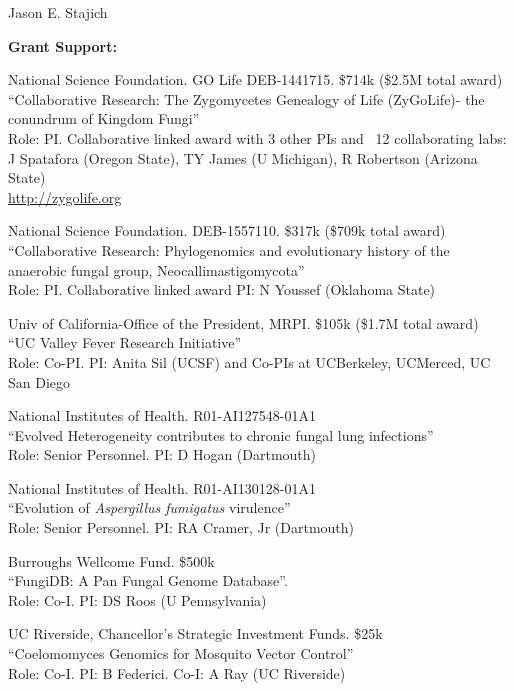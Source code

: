 \documentclass[10pt]{article}
\begin{document}
\begin{cv}{\centerline{Jason E. Stajich}}
\begin{cvlistcompact}{\bf Grant Support:}
\item [2015-2018] National Science Foundation. GO Life
  DEB-1441715. \$714k (\$2.5M total award) \\
``Collaborative Research: The Zygomycetes Genealogy of Life
  (ZyGoLife)- the conundrum of Kingdom Fungi'' \\
  Role: PI. Collaborative linked award with 3 other PIs and ~12
  collaborating labs: J Spatafora (Oregon State), TY James (U
  Michigan), R Robertson (Arizona State) \\
\url{http://zygolife.org} 

\item [2016-2019] National Science Foundation. DEB-1557110. \$317k
  (\$709k total award) \\
``Collaborative Research: Phylogenomics and evolutionary history of the anaerobic fungal group, Neocallimastigomycota'' \\
Role: PI. Collaborative linked award PI: N Youssef (Oklahoma State)

\item [2017-2020] Univ of California-Office of the President, MRPI. \$105k
  (\$1.7M total award) \\
``UC Valley Fever Research Initiative'' \\
Role: Co-PI.  PI: Anita Sil (UCSF) and Co-PIs at UCBerkeley, UCMerced,
UC San Diego

\item [2017-2020] National Institutes of Health. R01-AI127548-01A1 \\
``Evolved Heterogeneity contributes to chronic fungal lung
  infections'' \\
Role: Senior Personnel. PI: D Hogan (Dartmouth)

\item [2017-2020] National Institutes of Health. R01-AI130128-01A1 \\
  ``Evolution of \textit{Aspergillus fumigatus} virulence'' \\
Role: Senior Personnel. PI: RA Cramer, Jr (Dartmouth)

\item [{\bf Completed support}]

\item [2010-2013] Burroughs Wellcome Fund. \$500k \\
 ``FungiDB: A Pan Fungal Genome Database''. \\
Role: Co-I. PI: DS Roos (U Pennsylvania)

\item [2011-2012] UC Riverside, Chancellor's Strategic Investment
  Funds. \$25k \\
``Coelomomyces Genomics for Mosquito Vector Control'' \\
Role: Co-I. PI: B Federici. Co-I: A Ray (UC Riverside)


\end{cvlistcompact}
\end{cv}
\end{document}
